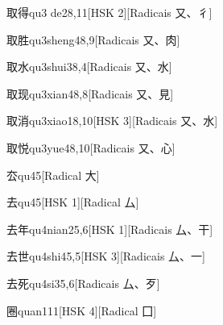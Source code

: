 \begin{entry}{取得}{qu3 de2}{8,11}[HSK 2][Radicais ⼜、⼻]
\end{entry}

\begin{entry}{取胜}{qu3sheng4}{8,9}[Radicais ⼜、⾁]
\end{entry}

\begin{entry}{取水}{qu3shui3}{8,4}[Radicais ⼜、⽔]
\end{entry}

\begin{entry}{取现}{qu3xian4}{8,8}[Radicais ⼜、⾒]
\end{entry}

\begin{entry}{取消}{qu3xiao1}{8,10}[HSK 3][Radicais ⼜、⽔]
\end{entry}

\begin{entry}{取悦}{qu3yue4}{8,10}[Radicais ⼜、⼼]
\end{entry}

\begin{entry}{厺}{qu4}{5}[Radical ⼤]
\end{entry}

\begin{entry}{去}{qu4}{5}[HSK 1][Radical ⼛]
\end{entry}

\begin{entry}{去年}{qu4nian2}{5,6}[HSK 1][Radicais ⼛、⼲]
\end{entry}

\begin{entry}{去世}{qu4shi4}{5,5}[HSK 3][Radicais ⼛、⼀]
\end{entry}

\begin{entry}{去死}{qu4si3}{5,6}[Radicais ⼛、⽍]
\end{entry}

\begin{entry}{圈}{quan1}{11}[HSK 4][Radical ⼞]
\end{entry}

